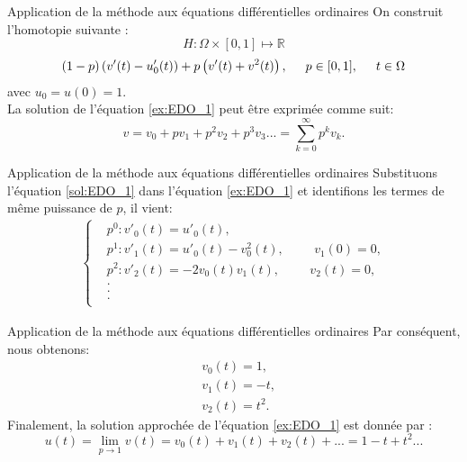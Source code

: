 \documentclass{sintefbeamer}
\begin{document}
\begin{frame}{Application de la méthode aux équations différentielles ordinaires}
     On construit l'homotopie suivante :
\begin{equation*}
    H: \Omega\times[0,1] \mapsto\mathbb{R}
\end{equation*}
\begin{align}
    (1-p)\left(v'(t)-u'_0(t)\right)+p\left(v'(t)+v^2 (t)\right), \hspace{0.5cm} p\in[0,1], \hspace{0.5cm} t\in \Omega
\end{align}
avec $u_0=u(0)=1$.\\
La solution de l'équation \ref{ex:EDO_1} peut être exprimée comme suit:
\begin{equation}\label{sol:EDO_1}    v=v_0+pv_1+p^2v_2+p^3v_3...=\sum_{k=0}^{\infty} p^{k}v_k.
\end{equation}
\end{frame}


\begin{frame}{Application de la méthode aux équations différentielles ordinaires}
    Substituons l'équation \ref{sol:EDO_1} dans l'équation \ref{ex:EDO_1} et identifions les termes de même puissance de $p$, il vient:
\begin{align*}
    \begin{cases}
        &p^0 : v'_0(t) = u'_0(t),\\
        &p^1 : v'_1(t) = u'_0(t)-v^2_0(t), \hspace{1cm} v_1(0)=0,\\
        &p^2 : v'_2(t) = -2v_0(t)v_1(t), \hspace{1cm} v_2(t)=0,\\
        &    .\\
        &    .\\
        &    .\\
    \end{cases}
\end{align*}
\end{frame}


\begin{frame}{Application de la méthode aux équations différentielles ordinaires}
    Par conséquent, nous obtenons:
\begin{align*}
    &v_0(t)=1,\\
    &v_1(t)=-t,\\
    &v_2(t)=t^2.
\end{align*}
    Finalement, la solution approchée de l'équation \ref{ex:EDO_1} est donnée par :
    \begin{equation}
    u(t)=\lim_{p \to 1} v(t) = v_0(t)+v_1(t)+v_2(t) + ... = 1-t + t^2 ...
\end{equation}
\end{frame}
\end{document}
